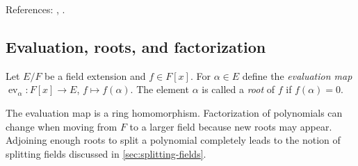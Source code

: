 References: \cite[\S9--11]{DF}, \cite[Ch.~II]{Lang}.

\subsection{Evaluation, roots, and factorization}
\begin{definition}
Let $E/F$ be a field extension and $f\in F[x]$. For $\alpha\in E$ define the \emph{evaluation map} $\operatorname{ev}_\alpha:F[x]\to E$, $f\mapsto f(\alpha)$. The element $\alpha$ is called a \emph{root} of $f$ if $f(\alpha)=0$.
\end{definition}

\begin{remark}
The evaluation map is a ring homomorphism. Factorization of polynomials can change when moving from $F$ to a larger field because new roots may appear. Adjoining enough roots to split a polynomial completely leads to the notion of splitting fields discussed in \cref{sec:splitting-fields}.
\end{remark}

